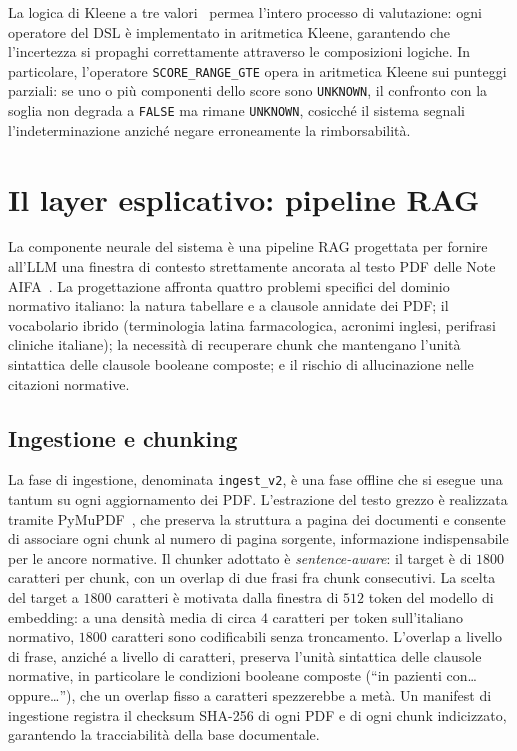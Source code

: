 La logica di Kleene a tre valori~\cite{kleene1952introduction} permea l'intero
processo di valutazione: ogni operatore del DSL è implementato in aritmetica
Kleene, garantendo che l'incertezza si propaghi correttamente attraverso
le composizioni logiche.
In particolare, l'operatore \texttt{SCORE\_RANGE\_GTE} opera in aritmetica
Kleene sui punteggi parziali: se uno o più componenti dello score sono
\texttt{UNKNOWN}, il confronto con la soglia non degrada a \texttt{FALSE}
ma rimane \texttt{UNKNOWN}, cosicché il sistema segnali l'indeterminazione
anziché negare erroneamente la rimborsabilità.

\section{Il layer esplicativo: pipeline RAG}
\label{sec:layer-esplicativo}

La componente neurale del sistema è una pipeline RAG progettata per fornire
all'LLM una finestra di contesto strettamente ancorata al testo PDF delle
Note AIFA~\cite{lewis2020rag}.
La progettazione affronta quattro problemi specifici del dominio normativo
italiano: la natura tabellare e a clausole annidate dei PDF; il vocabolario
ibrido (terminologia latina farmacologica, acronimi inglesi, perifrasi
cliniche italiane); la necessità di recuperare chunk che mantengano l'unità
sintattica delle clausole booleane composte; e il rischio di allucinazione
nelle citazioni normative.

\subsection{Ingestione e chunking}
\label{subsec:ingestione}

La fase di ingestione, denominata \texttt{ingest\_v2}, è una fase offline
che si esegue una tantum su ogni aggiornamento dei PDF.
L'estrazione del testo grezzo è realizzata tramite PyMuPDF~\cite{pymupdf},
che preserva la struttura a pagina dei documenti e consente di associare
ogni chunk al numero di pagina sorgente, informazione indispensabile per
le ancore normative.
Il chunker adottato è \emph{sentence-aware}: il target è di $1800$ caratteri
per chunk, con un overlap di due frasi fra chunk consecutivi.
La scelta del target a $1800$ caratteri è motivata dalla finestra di $512$
token del modello di embedding: a una densità media di circa $4$ caratteri
per token sull'italiano normativo, $1800$ caratteri sono codificabili senza
troncamento.
L'overlap a livello di frase, anziché a livello di caratteri, preserva
l'unità sintattica delle clausole normative, in particolare le condizioni
booleane composte (``in pazienti con\ldots oppure\ldots''), che un overlap
fisso a caratteri spezzerebbe a metà.
Un manifest di ingestione registra il checksum SHA-256 di ogni PDF e di
ogni chunk indicizzato, garantendo la tracciabilità della base documentale.

